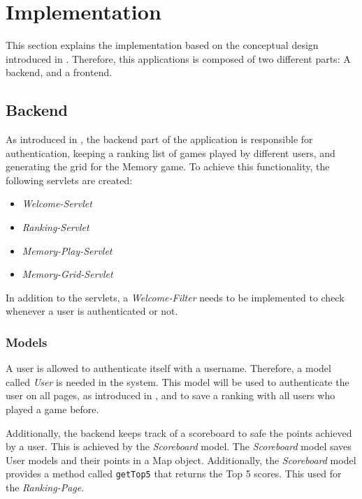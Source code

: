 \section{Implementation}\label{sec:03_impl}
This section explains the implementation based on the conceptual design introduced in .
Therefore, this applications is composed of two different parts: A backend, and a frontend.


\subsection{Backend}\label{subsec:03_impl_backend}
%
As introduced in , the backend part of the application is responsible for authentication, keeping a ranking list of games played by different users, and generating the grid for the Memory game.
To achieve this functionality, the following servlets are created:
\begin{itemize}
\item \textit{Welcome-Servlet}
\item \textit{Ranking-Servlet}
\item \textit{Memory-Play-Servlet}
\item \textit{Memory-Grid-Servlet}
\end{itemize}
In addition to the servlets, a \textit{Welcome-Filter} needs to be implemented to check whenever a user is authenticated or not.

\subsubsection{Models}\label{subsubsec:03_impl_backend_models}
A user is allowed to authenticate itself with a username. Therefore, a model called \textit{User} is needed in the system.
This model will be used to authenticate the user on all pages, as introduced in , and to save a ranking with all users who played a game before.

Additionally, the backend keeps track of a scoreboard to safe the points achieved by a user. This is achieved by the \textit{Scoreboard} model.
The \textit{Scoreboard} model saves User models and their points in a Map object.
Additionally, the \textit{Scoreboard} model provides a method called \texttt{getTop5} that returns the Top 5 scores. This used for the \textit{Ranking-Page}.

